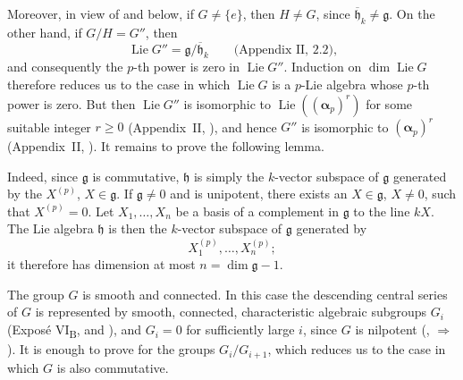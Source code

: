 Moreover, in view of  and  below, if
\(G\ne\{e\}\), then \(H\ne G\), since
\(\overline{\mathfrak h}_k\ne\mathfrak g\).  On the other hand, if
\(G/H=G''\), then
\[
  \operatorname{Lie}G''
  =\mathfrak g/\overline{\mathfrak h}_k
  \qquad\text{(Appendix~II, 2.2),}
\]
and consequently the \(p\)-th power is zero in
\(\operatorname{Lie}G''\).  Induction on
\(\dim\operatorname{Lie}G\) therefore reduces us to the case in
which \(\operatorname{Lie}G\) is a \(p\)-Lie algebra whose
\(p\)-th power is zero.  But then \(\operatorname{Lie}G''\) is
isomorphic to \(\operatorname{Lie}((\boldsymbol\alpha_p)^r)\) for
some suitable integer \(r\geq0\) (Appendix~II, ), and hence
\(G''\) is isomorphic to \((\boldsymbol\alpha_p)^r\)
(Appendix~II, ).  It remains to prove the following lemma.


Indeed, since \(\mathfrak g\) is commutative, \(\mathfrak h\) is
simply the \(k\)-vector subspace of \(\mathfrak g\) generated by the
\(X^{(p)}\), \(X\in\mathfrak g\).  If \(\mathfrak g\ne0\) and is
unipotent, there exists an \(X\in\mathfrak g\), \(X\ne0\), such
that \(X^{(p)}=0\).  Let \(X_1,\ldots,X_n\) be a basis of a
complement in \(\mathfrak g\) to the line \(kX\).  The Lie algebra
\(\mathfrak h\) is then the \(k\)-vector subspace of
\(\mathfrak g\) generated by
\[
  X_1^{(p)},\ldots,X_n^{(p)};
\]
it therefore has dimension at most
\(n=\dim\mathfrak g-1\).

The group \(G\) is smooth and connected.  In this case the
descending central series of \(G\) is represented by smooth,
connected, characteristic algebraic subgroups \(G_i\)
(Exposé VI\textsubscript{B},  and ), and \(G_i=0\) for
sufficiently large \(i\), since \(G\) is nilpotent
(, \(\Rightarrow\)).  It is enough to prove  for the
groups \(G_i/G_{i+1}\), which reduces us to the case in which \(G\)
is also commutative.

